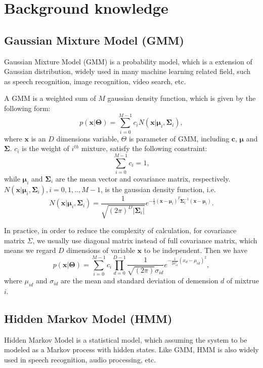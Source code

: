 \chapter{Background knowledge}
\section{Gaussian Mixture Model (GMM)}
Gaussian Mixture Model (GMM) is a probability model, which is a extension of Gaussian distribution, widely used in many machine learning related field, such as speech recognition, image recognition, video search, etc. 

A GMM is a weighted sum of $M$ gaussian density function, which is given by the following form:
\begin{equation}
p(\mathbf{x}|\mathbf{\Theta}) = \sum_{i = 0}^{M - 1} c_iN(\mathbf{x}|\mathbf{\mu}_i, \mathbf{\Sigma}_i),
\end{equation}
where $\mathbf{x}$ is an $D$ dimensions variable, $\Theta$ is parameter of GMM, including $\mathbf{c}$, $\mathbf{\mu}$ and $\mathbf{\Sigma}$. $c_i$ is the weight of $i^{th}$ mixture, satisfy the following constraint:
\begin{equation}
\sum_{i=0}^{M-1}c_i=1,
\end{equation}
while $\mathbf{\mu}_i$ and $\mathbf{\Sigma}_i$ are the mean vector and covariance matrix, respectively. $N(\mathbf{x}|\mathbf{\mu}_i, \mathbf{\Sigma}_i), i = 0, 1, .., M - 1$, is the gaussian density function, i.e.
\begin{equation}
 N(\mathbf{x}|\mathbf{\mu}_i, \mathbf{\Sigma}_i) = \frac{1}{\sqrt{(2\pi)^D|\mathbf{\Sigma}_i|}}e^{-\frac{1}{2}(\mathbf{x}-\mathbf{\mu}_i)^T\mathbf{\Sigma}_i^{-1}(\mathbf{x}-\mathbf{\mu}_i)}.
\end{equation}

In practice, in order to reduce the complexity of calculation, for covariance matrix $\Sigma$, we usually use diagonal matrix instead of full covariance matrix, which means we regard $D$ dimensions of variable $\mathbf{x}$ to be independent. Then we have
\begin{equation}
p(\mathbf{x}|\mathbf{\Theta}) = \sum_{i = 0}^{M - 1} c_i\prod_{d=0}^{D-1} \frac{1}{\sqrt{(2\pi)}\sigma_{id}}e^{-\frac{1}{2\sigma_{id}^{2}}(x_d-\mu_{id})^2},\label{GMM-p}
\end{equation}
where $\mu_{id}$ and $\sigma_{id}$ are the mean and standard deviation of demension $d$ of mixtrue $i$.
\section{Hidden Markov Model (HMM)}
Hidden Markov Model is a statistical model, which assuming the system to be modeled as a Markov process with hidden states. Like GMM, HMM is also widely used in speech recognition, audio processing, etc.


